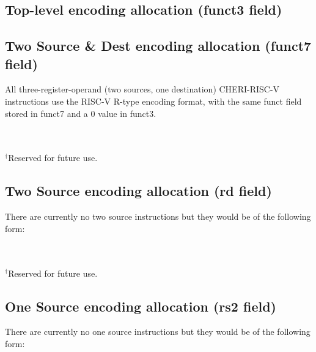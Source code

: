 {	\subsection*{Top-level encoding allocation (funct3 field)}
	{\rvcherienctablefontsize
	\rvcherienctabletop
	}

	\subsection*{Two Source \& Dest encoding allocation (funct7 field)}
	All three-register-operand (two sources, one destination) CHERI-RISC-V instructions use the RISC-V R-type encoding format, with the same funct field stored in funct7 and a 0 value in funct3.

	\vspace{1em}


	\vspace{1em}

	{\rvcherienctablefontsize
	\def\rvcherireservedfootnotemark{$^\dagger$}
	\rvcherienctablesrcsrcdest\\\\
	\footnotesize
	$^\dagger$Reserved for future use.
	}

	\clearpage
	\subsection*{Two Source encoding allocation  (rd field)}
	There are currently no two source instructions but they would be of the following form:
	\vspace{1em}

	\rvcheriheader

	\vspace{1em}

	{\rvcherienctablefontsize
	\def\rvcherireservedfootnotemark{$^\dagger$}
	\rvcherienctablesrcsrc\\\\
	\footnotesize
	$^\dagger$Reserved for future use.
	}

	\vspace{1em}

	\subsection*{One Source encoding allocation (rs2 field)}
	There are currently no one source instructions but they would be of the following form:

}
